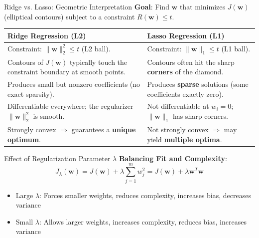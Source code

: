 \documentclass[serif, aspectratio=169]{beamer}
\begin{document}
\begin{frame}{Ridge vs. Lasso: Geometric Interpretation}
    \textbf{Goal}: Find $\mathbf{w}$ that minimizes $J(\mathbf{w})$ (elliptical contours) subject to a constraint $R(\mathbf{w}) \le t$.
    \vspace{1em}

    \begin{table}[h!]
        \centering
        \renewcommand{\arraystretch}{1.4}
        \setlength{\tabcolsep}{8pt}
        \begin{tabular}{|p{}|p{}|}
            \hline
            \textbf{Ridge Regression (L2)} & \textbf{Lasso Regression (L1)} \\
            \hline
            Constraint: $\|\mathbf{w}\|_2^2 \le t$ (L2 ball). &
            Constraint: $\|\mathbf{w} \|_1 \le t$ (L1 ball). \\
            \hline
            Contours of $J(\mathbf{w})$ typically touch the constraint boundary at smooth points. &
            Contours often hit the sharp \textbf{corners} of the diamond. \\
            \hline
            Produces small but nonzero coefficients (no exact sparsity). &
            Produces \textbf{sparse} solutions (some coefficients exactly zero). \\
            \hline
            Differentiable everywhere; the regularizer $\|\mathbf{w}\|_2^2$ is smooth. &
            Not differentiable at $w_i = 0$; $\|\mathbf{w}\|_1$ has sharp corners. \\
            \hline
            Strongly convex $\Rightarrow$ guarantees a \textbf{unique optimum}. &
            Not strongly convex $\Rightarrow$ may yield \textbf{multiple optima}. \\
            \hline
        \end{tabular}
    \end{table}
\end{frame}



\begin{frame}{Effect of Regularization Parameter \( \lambda \)}
    \textbf{Balancing Fit and Complexity}:
    \[
    J_{\lambda}(\mathbf{w}) = J(\mathbf{w}) + \lambda \sum_{j=1}^{m} w_j^2 = J(\mathbf{w}) + \lambda \mathbf{w}^T\mathbf{w}
    \]
    \begin{itemize}
        \item Large \( \lambda \): Forces smaller weights, reduces complexity, increases bias, decreases variance
        \item Small \( \lambda \): Allows larger weights, increases complexity, reduces bias, increases variance
    \end{itemize}
\end{frame}
\end{document}
